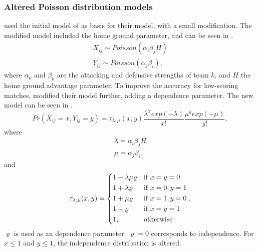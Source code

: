 \subsubsection{Altered Poisson distribution models}

\citet{bib:dixon-coles-1997} used the initial model of \citet{bib:maher-1982} as basis for their model, with a small modification. The modified model included the home ground parameter, and can be seen in .
\begin{equation}
    \begin{aligned}
        X_{ij} \sim Poisson(\alpha_{i} \beta_{j} H) \\
        Y_{ij} \sim Poisson(\alpha_{j} \beta_{i}),
    \end{aligned}
    \label{eq:dixon-coles-model}
\end{equation}
where $\alpha_{k}$ and $\beta_{k}$ are the attacking and defensive strengths of team $k$, and $H$ the home ground advantage parameter. To improve the accuracy for low-scoring matches, \citet{bib:dixon-coles-1997} modified their model further, adding a dependence parameter. The new model can be seen in .
\begin{equation}
    Pr(X_{ij} = x, Y_{ij} = y) = \tau_{\lambda, \mu}(x, y) \frac{\lambda^x exp(-\lambda)}{x!} \frac{\mu^y exp(-\mu)}{y!},
    \label{eq:dixon-coles-modified-model}
\end{equation}
where
\begin{equation}
    \begin{aligned}
        \lambda = \alpha_{i} \beta_{j} H \\
        \mu = \alpha_{j} \beta_{i}
    \end{aligned}
\end{equation}
and
\begin{equation}
    \tau_{\lambda, \mu}(x, y) =
    \begin{dcases}
        1 - \lambda \mu \varrho & \text{if } x = y = 0 \\
        1 + \lambda \varrho     & \text{if } x = 0, y = 1 \\
        1 + \mu \varrho         & \text{if } x = 1, y = 0 \\
        1 - \varrho             & \text{if } x = y = 1 \\
        1,                      & \text{otherwise}
    \end{dcases}.
\end{equation}
$\varrho$ is used as an dependence parameter. $\varrho = 0$ corresponds to independence. For $x \leq 1$ and $y \leq 1$, the independence distribution is altered.

